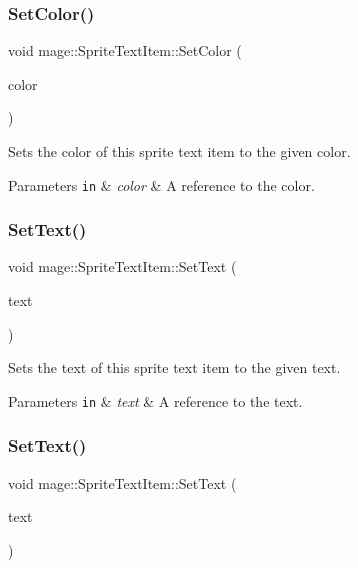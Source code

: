 \subsubsection{\texorpdfstring{Set\+Color()}{SetColor()}\hspace{0.1cm}{\footnotesize\ttfamily [2/2]}}
{\footnotesize\ttfamily void mage\+::\+Sprite\+Text\+Item\+::\+Set\+Color (\begin{DoxyParamCaption}\item[{const X\+M\+V\+E\+C\+T\+OR \&}]{color }\end{DoxyParamCaption})}

Sets the color of this sprite text item to the given color.


\begin{DoxyParams}[1]{Parameters}
\mbox{\tt in}  & {\em color} & A reference to the color. \\
\hline
\end{DoxyParams}
\hypertarget{structmage_1_1_sprite_text_item_a76da120ec8798b22299d7050e8f05afb}{}\label{structmage_1_1_sprite_text_item_a76da120ec8798b22299d7050e8f05afb} 
\subsubsection{\texorpdfstring{Set\+Text()}{SetText()}\hspace{0.1cm}{\footnotesize\ttfamily [1/2]}}
{\footnotesize\ttfamily void mage\+::\+Sprite\+Text\+Item\+::\+Set\+Text (\begin{DoxyParamCaption}\item[{const wstring \&}]{text }\end{DoxyParamCaption})}

Sets the text of this sprite text item to the given text.


\begin{DoxyParams}[1]{Parameters}
\mbox{\tt in}  & {\em text} & A reference to the text. \\
\hline
\end{DoxyParams}
\hypertarget{structmage_1_1_sprite_text_item_a702f0a51a8bf08e0d59b770d81bb2bee}{}\label{structmage_1_1_sprite_text_item_a702f0a51a8bf08e0d59b770d81bb2bee} 
\subsubsection{\texorpdfstring{Set\+Text()}{SetText()}\hspace{0.1cm}{\footnotesize\ttfamily [2/2]}}
{\footnotesize\ttfamily void mage\+::\+Sprite\+Text\+Item\+::\+Set\+Text (\begin{DoxyParamCaption}\item[{const wchar\+\_\+t $\ast$}]{text }\end{DoxyParamCaption})}


